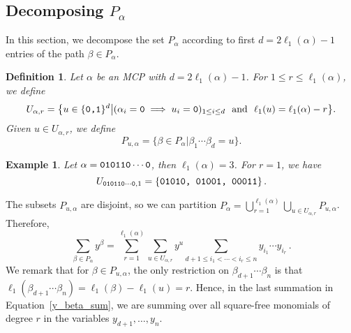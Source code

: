 \documentclass[10pt,a4paper]{article}
\newtheorem{definition}{Definition}[section]
\newtheorem{example}{Example}[section]
\begin{document}
\subsection{Decomposing $P_\alpha$} \label{path_partition}
In this section, we decompose the set $P_\alpha$ according to first $d=2\ell_1(\alpha)-1$ entries of the path $\beta\in P_\alpha$.
\begin{definition} \label{u_alphar}
	Let $\alpha$ be an MCP with $d = 2\ell_1(\alpha)-1$. For $1 \leq r \leq \ell_1(\alpha)$, we define
		\begin{equation}
		U_{\alpha, r} = \big \{ u\in \{\textnormal{\texttt{0,1}}\}^d \big | ( \alpha_i = \textnormal{\texttt{0}} \implies u_i = \textnormal{\texttt{0}})_{1 \leq i \leq d}\  \text{ and }\   \ell_1(u) = \ell_1(\alpha) -r  \big \}.
		 \label{u_alpha_eqn}
	\end{equation}
	Given $u \in U_{\alpha,r}$, we define
	\begin{equation}
		P_{u, \alpha} = \big\{ \beta\in P_\alpha \big|  \beta_{1} \cdots \beta_d=u  \big\}. 
		\label{p_u_alpha_eqn}
	\end{equation}
\end{definition}
\begin{example} \label{u_alpha_example}
	Let $\alpha = \textnormal{\texttt{010110}} \cdots \textnormal{\texttt{0}}$, then $\ell_1(\alpha)=3$. For $r =1$, we have
		\begin{equation*} 
		U_{\textnormal{\texttt{010110}} \cdots \textnormal{\texttt{0}},1} = \{\textnormal{\texttt{01010, 01001, 00011}}\}\,.
	\end{equation*}
\end{example} 
The subsets $P_{u, \alpha}$ are disjoint, so we can partition $P_\alpha = \bigcup_{r = 1}^{\ell_1(\alpha)} \bigcup_{u \in U_{\alpha,r}} P_{u,\alpha}$. Therefore, 
\begin{equation} \label{y_beta_sum}
	\sum_{\beta \in P_\alpha} y^ \beta   = \sum_{r=1}^{\ell_1(\alpha)} \sum_{u \in U_{\alpha,r}} y^u
										\sum_{d+1 \leq i_1 < \cdots < i_r \leq n} y_{i_1} \cdots y_{i_{r}}   \,.
\end{equation} 
We remark that for $\beta\in P_{u, \alpha}$, the only restriction on $\beta_{d+1}\cdots\beta_n$ is that $\ell_1(\beta_{d+1}\cdots\beta_n)=\ell_1(\beta)-\ell_1(u)=r$.
Hence, in the last  summation in Equation~\eqref{y_beta_sum},  we are summing over all square-free monomials of degree $r$ in the variables $y_{d+1},\dots,y_n$.
\end{document}

